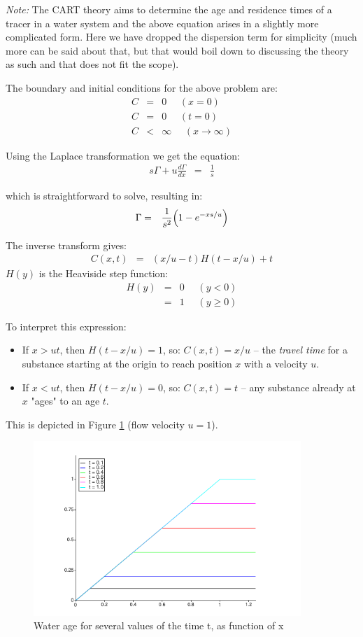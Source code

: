 \documentclass[onecolumn]{article}
\begin{document}
\emph{Note:}
The CART theory aims to determine the age and residence times of a tracer in a water system and the above equation
arises in a slightly more complicated form. Here we have dropped the dispersion term for simplicity (much
more can be said about that, but that would boil down to discussing the theory as such and that does not
fit the scope).

The boundary and initial conditions for the above problem are:
\begin{eqnarray}
     C &=& 0 ~~~~~~ (x = 0) \\
     C &=& 0 ~~~~~~ (t = 0) \\
     C &<& \infty ~~~~~~(x \rightarrow \infty)
\end{eqnarray}

Using the Laplace transformation we get the equation:
\begin{eqnarray}
    s \Gamma + u \frac{d \Gamma}{d x} &=& \frac{1}{s}
\end{eqnarray}

\noindent which is straightforward to solve, resulting in:
\begin{eqnarray}
    \Gamma &=& \frac{1}{s^2} \Bigl ( 1 - e^{-xs/u} \Bigr )
\end{eqnarray}

The inverse transform gives:
\begin{eqnarray}
    C(x,t) &=& (x/u - t) H(t - x/u) + t
\end{eqnarray}
\noindent $H(y)$ is the Heaviside step function:
\begin{eqnarray}
    H(y) &=& 0 ~~~~~~ (y < 0) \\
         &=& 1 ~~~~~~ (y \geq 0)
\end{eqnarray}

To interpret this expression:
\begin{itemize}
\item
If $x > ut$, then $H(t-x/u) = 1$, so: $C(x,t) = x/u$ -- the \emph{travel time} for a substance starting at the origin
to reach position $x$ with a velocity $u$.
\item
If $x < ut$, then $H(t-x/u) = 0$, so: $C(x,t) = t$ -- any substance already at $x$ "ages" to an age $t$.
\end{itemize}

This is depicted in Figure \ref{cartChannel} (flow velocity $u = 1$).

\begin{figure}[H]
\caption{Water age for several values of the time t, as function of x}
\label{cartChannel}
\begin{center}
\includegraphics[width=0.9\textwidth]{cart_channel.pdf}
\end{center}
\end{figure}




\end{document}
